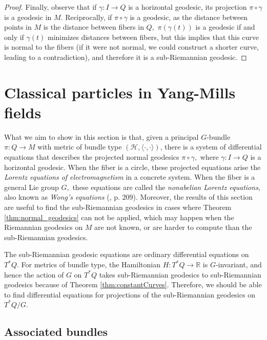 \documentclass[12pt, letterpaper, reqno]{amsart}
\theoremstyle{definition}
\theoremstyle{plain}
\theoremstyle{remark}
\begin{document}
\begin{proof}
	Finally, observe that if $ \gamma: I \rightarrow Q $ is a horizontal geodesic, its projection $ \pi\circ\gamma $ is a geodesic in $ M. $ Reciprocally, if $ \pi\circ\gamma $ is a geodesic, as the distance between points in $ M $ is the distance between fibers in $ Q, $ $ \pi(\gamma(t) ) $ is a geodesic if and only if $\gamma(t)$ minimizes distances between fibers, but this implies that this curve is normal to the fibers (if it were not normal, we could construct a shorter curve, leading to a contradiction), and therefore it is a sub-Riemannian geodesic.  
\end{proof}

\section{Classical particles in Yang-Mills fields}%
\label{sec:classical_particles_in_yang_mills_fields}


What we aim to show in this section is that, given a principal $ G $-bundle $ \pi:Q \rightarrow M $ with metric of bundle type $ (\mathcal{H}, \langle\cdot, \cdot \rangle) $,   there is a system of differential equations that describes the projected normal geodesics $ \pi\circ\gamma, $ where $ \gamma: I \rightarrow Q $ is a horizontal geodesic. When the fiber is a circle, these projected equations arise the \textit{Lorentz equations of electromagnetism} in a concrete system. When the fiber is a general Lie group $ G, $ these equations are called the \textit{nonabelian Lorentz equations,} also known as \textit{Wong's equations} (\cite{montgomery2002tour}, p. 209). Moreover, the results of this section are useful to find the sub-Riemannian geodesics in cases where Theorem \ref{thm:normal_geodesics} can not be applied, which may happen when the Riemannian geodesics on $ M $ are not known, or are harder to compute than the sub-Riemannian geodesics.

The sub-Riemannian geodesic equations are ordinary differential equations on $ T^*Q. $ For metrics of bundle type, the Hamiltonian $ H: T^*Q \rightarrow  \mathbb{R} $ is $ G $-invariant, and hence the action of $ G $ on $ T^*Q $ takes sub-Riemannian geodesics to sub-Riemannian geodesics because of Theorem \ref{thm:constantCurves}. Therefore, we should be able to find differential equations for projections of the sub-Riemannian geodesics on $ T^*Q/G. $ 

 \subsection{Associated bundles}%
 \label{sub:associated_bundles}
\end{document}
